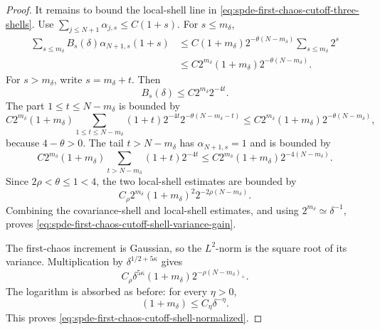 \begin{proof}
It remains to bound the local-shell line in
\eqref{eq:spde-first-chaos-cutoff-three-shells}.  Use
\(\sum_{j\leq N+1}\alpha_{j,s}\leq C(1+s)\).  For \(s\leq m_\delta\),
\[
\begin{aligned}
  \sum_{s\leq m_\delta}
  B_s(\delta)\alpha_{N+1,s}(1+s)
  &\leq
  C(1+m_\delta)2^{-\theta(N-m_\delta)}
  \sum_{s\leq m_\delta}2^s                         \\
  &\leq
  C2^{m_\delta}(1+m_\delta)
  2^{-\theta(N-m_\delta)} .
\end{aligned}
\]
For \(s>m_\delta\), write \(s=m_\delta+t\).  Then
\[
  B_s(\delta)\leq C2^{m_\delta}2^{-4t}.
\]
The part \(1\leq t\leq N-m_\delta\) is bounded by
\[
  C2^{m_\delta}(1+m_\delta)
  \sum_{1\leq t\leq N-m_\delta}
  (1+t)2^{-4t}2^{-\theta(N-m_\delta-t)}
  \leq
  C2^{m_\delta}(1+m_\delta)2^{-\theta(N-m_\delta)} ,
\]
because \(4-\theta>0\).  The tail \(t>N-m_\delta\) has
\(\alpha_{N+1,s}=1\) and is bounded by
\[
  C2^{m_\delta}(1+m_\delta)
  \sum_{t>N-m_\delta}(1+t)2^{-4t}
  \leq
  C2^{m_\delta}(1+m_\delta)2^{-4(N-m_\delta)} .
\]
Since \(2\rho<\theta\leq1<4\), the two local-shell estimates are bounded by
\[
  C_\rho2^{m_\delta}(1+m_\delta)^2
  2^{-2\rho(N-m_\delta)} .
\]
Combining the covariance-shell and local-shell estimates, and using
\(2^{m_\delta}\simeq\delta^{-1}\), proves
\eqref{eq:spde-first-chaos-cutoff-shell-variance-gain}.

The first-chaos increment is Gaussian, so the \(L^2\)-norm is the square root
of its variance.  Multiplication by \(\delta^{1/2+5\kappa}\) gives
\[
  C_\rho\delta^{5\kappa}(1+m_\delta)
  2^{-\rho(N-m_\delta)_+}.
\]
The logarithm is absorbed as before: for every \(\eta>0\),
\[
  (1+m_\delta)\leq C_\eta\delta^{-\eta}.
\]
This proves \eqref{eq:spde-first-chaos-cutoff-shell-normalized}.
\end{proof}

